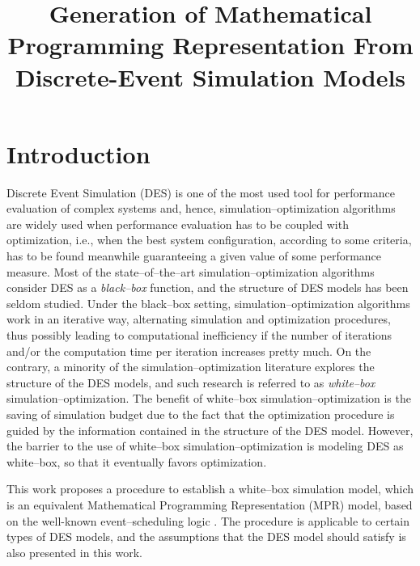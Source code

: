 \documentclass[]{interact}
\theoremstyle{plain}%
\theoremstyle{definition}
\theoremstyle{remark}
\begin{document}

\title{Generation of Mathematical Programming Representation From Discrete-Event Simulation Models}
\maketitle
\begin{abstract}

\end{abstract}

\section{Introduction}
Discrete Event Simulation (DES) is one of the most used tool for performance evaluation of %
complex systems and, hence, simulation--optimization algorithms are widely used %
when performance evaluation has to be coupled with optimization, i.e., when the best system configuration, according to some criteria, has to be found meanwhile guaranteeing a given value of some performance measure.  
Most of the state--of--the--art simulation--optimization algorithms consider DES as a \textit{black--box} function, and the structure of DES models has been seldom studied. Under the black--box setting, simulation--optimization algorithms work in an iterative way, alternating simulation and optimization procedures, 
thus possibly leading to computational inefficiency if the number of iterations and/or the computation time per iteration increases pretty much.
On the contrary, a minority of the simulation--optimization literature explores the structure of the DES models, and %
such research is referred to as \textit{white--box} simulation--optimization. The benefit of white--box simulation--optimization is the saving of simulation budget due to the fact that %
the optimization procedure is guided by the information contained in the structure of the DES model. However, the barrier to the use of white--box simulation--optimization is modeling DES as white--box, so that it eventually favors optimization. 

This work proposes a procedure to establish a white--box simulation model, which is an equivalent Mathematical Programming Representation (MPR) model, based on the well-known event--scheduling logic \cite{law2014simulation}. %
The procedure is applicable to certain types of DES models, and the assumptions that the DES model should satisfy is also presented in this work.
\end{document}
